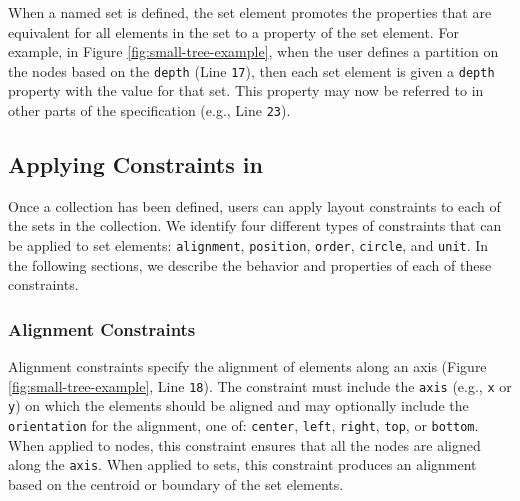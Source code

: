 
When a named set is defined, the set element promotes the properties that
are equivalent for all elements in the set to a property of the set
element. For example, in Figure \ref{fig:small-tree-example}, when the user
defines a partition on the nodes based on the \texttt{depth} (Line
\texttt{17}), then each set element is given a \texttt{depth} property with
the value for that set. This property may now be referred to in other parts
of the \projectname specification (e.g., Line \texttt{23}).


\subsection{Applying Constraints in \projectname}
\label{sec:constraints}
Once a collection has been defined, users can apply layout constraints to
each of the sets in the collection. We identify four different types of
constraints that can be applied to set elements: \texttt{alignment},
\texttt{position}, \texttt{order}, \texttt{circle}, and \texttt{unit}. In
the following sections, we describe the behavior and properties of each of
these constraints.


\subsubsection{Alignment Constraints}
 Alignment constraints
specify the alignment of elements along an axis (Figure
\ref{fig:small-tree-example}, Line \texttt{18}). The constraint must
include the \texttt{axis} (e.g., \texttt{x} or \texttt{y}) on which the
elements should be aligned and may optionally include the
\texttt{orientation} for the alignment, one of: \texttt{center},
\texttt{left}, \texttt{right}, \texttt{top}, or \texttt{bottom}. When
applied to nodes, this constraint ensures that all the nodes are aligned
along the \texttt{axis}. When applied to sets, this constraint produces an
alignment based on the centroid or boundary of the set elements.

